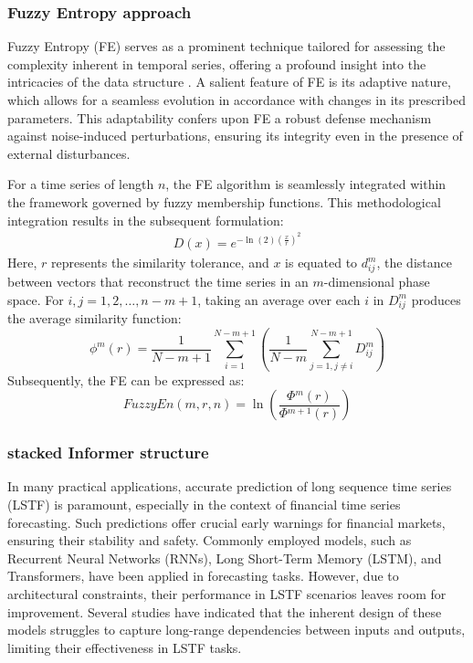 \documentclass[sn-mathphys,Numbered]{sn-jnl}
\theoremstyle{thmstyleone}%
\theoremstyle{thmstyletwo}%
\theoremstyle{thmstylethree}%
\begin{document}
\subsubsection{Fuzzy Entropy approach}\label{subsec2}

Fuzzy Entropy (FE) serves as a prominent technique tailored for assessing the complexity inherent in temporal series, offering a profound insight into the intricacies of the data structure \cite{chen2009measuring}. A salient feature of FE is its adaptive nature, which allows for a seamless evolution in accordance with changes in its prescribed parameters. This adaptability confers upon FE a robust defense mechanism against noise-induced perturbations, ensuring its integrity even in the presence of external disturbances.

For a time series of length \( n \), the FE algorithm is seamlessly integrated within the framework governed by fuzzy membership functions. This methodological integration results in the subsequent formulation:
\begin{align}
D(x) = e^{-\ln(2)\left(\frac{x}{r}\right)^{2}}
\end{align}
Here, \( r \) represents the similarity tolerance, and \( x \) is equated to \( d^{m}_{ij} \), the distance between vectors that reconstruct the time series in an \( m \)-dimensional phase space. For \( i, j = 1, 2, \ldots, n - m + 1 \), taking an average over each \( i \) in \( D^{m}_{ij} \) produces the average similarity function:
\begin{equation}
\phi^m(r) = \frac{1}{N-m+1} \sum_{i=1}^{N-m+1}\left(\frac{1}{N-m} \sum_{j=1, j \neq i}^{N-m+1} D_{i j}^m\right)
\end{equation}
Subsequently, the FE can be expressed as:
\begin{equation}
FuzzyEn(m, r, n) = \ln\left(\frac{\Phi{}^{m}(r)}{\Phi{}^{m+1}(r)}\right)
\end{equation}

\subsubsection{stacked Informer structure}\label{subsec3}

In many practical applications, accurate prediction of long sequence time series (LSTF) is paramount, especially in the context of financial time series forecasting. Such predictions offer crucial early warnings for financial markets, ensuring their stability and safety. Commonly employed models, such as Recurrent Neural Networks (RNNs), Long Short-Term Memory (LSTM), and Transformers, have been applied in forecasting tasks\cite{vaswani2017attention}\cite{selvin2017stock}\cite{ye2019river}. However, due to architectural constraints, their performance in LSTF scenarios leaves room for improvement. Several studies \cite{zhou2021informer}\cite{pascanu2013difficulty} have indicated that the inherent design of these models struggles to capture long-range dependencies between inputs and outputs, limiting their effectiveness in LSTF tasks.
\end{document}
